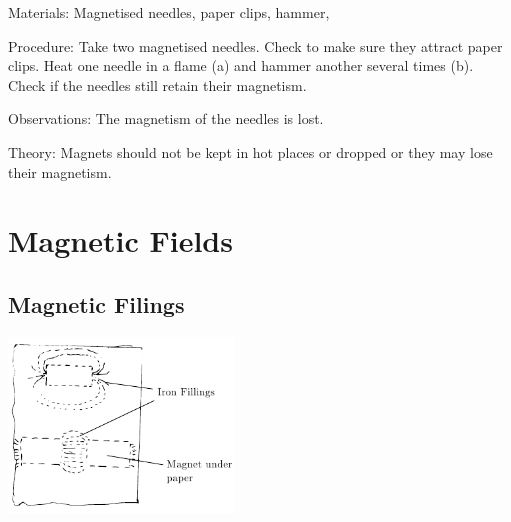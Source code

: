 \begin{multicols}{2}
\begin{description*}
\item[Materials:]{Magnetised needles, paper clips, hammer, }
\item[Procedure:]{Take two magnetised needles. Check to make sure they attract paper clips. Heat one needle in a flame (a) and hammer another several times (b). Check if the needles still retain their
magnetism.}
\item[Observations:]{The magnetism of the needles is lost.}
\item[Theory:]{Magnets should not be kept in hot places or dropped or they may lose their
magnetism.}
\end{description*}


\section*{Magnetic Fields}


\subsection{Magnetic Filings} 

\begin{center}
\includegraphics[width=0.45\textwidth]{./img/magnetic-fields.png}
\end{center}


\end{multicols}
